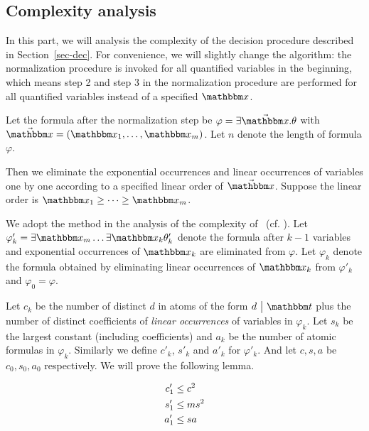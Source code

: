\subsection{Complexity analysis}

In this part, we will analysis the complexity of the decision procedure described in Section~\ref{sec-dec}. For convenience, we will slightly change the algorithm: the normalization procedure is invoked for all quantified variables in the beginning, which means step 2 and step 3 in the normalization procedure are performed for all quantified variables instead of a specified $\ivarx$. 

Let the formula after the normalization step be $\varphi = \exists \vec{\ivarx}. \theta$ with $\vec{\ivarx} = (\ivarx_1,\dots,\ivarx_m)$. Let $n$ denote the length of formula $\varphi$.

Then we eliminate the exponential occurrences and linear occurrences of variables one by one according to a specified linear order of $\vec{\ivarx}$. Suppose the linear order is $\ivarx_1\ge \dots \ge \ivarx_m$.

We adopt the method in the analysis of the complexity of \pa \ (cf. \cite{Oppen73}).  Let $\varphi'_k = \exists \ivarx_m \dots  \exists \ivarx_{k}\theta'_k$ denote the formula after $k-1$ variables and exponential occurrences of $\ivarx_k$ are eliminated from $\varphi$. Let $\varphi_k$ denote the formula obtained by eliminating linear occurrences of $\ivarx_k$ from $\varphi'_k$ and $\varphi_0=\varphi$.


Let $c_k$ be the number of distinct $d$ in atoms of the form $d \ \big | \ \iterm$ plus the number of distinct coefficients of \emph{linear occurrences} of variables in $\varphi_k$. Let $s_k$ be the largest constant (including coefficients) and $a_k$ be the number of atomic formulas in $\varphi_k$. Similarly we define $c'_k$, $s'_k$ and $a'_k$ for $\varphi'_k$. And let $c,s,a$ be $c_0,s_0,a_0$ respectively. We will prove the following lemma.
\begin{lemma}\label{lem:cpx exp}
    \begin{align}
        c'_1&\le c^2 \notag \\
        s'_1&\le ms^2 \notag\\
        a'_1&\le sa\notag 
    \end{align} 
\end{lemma}

